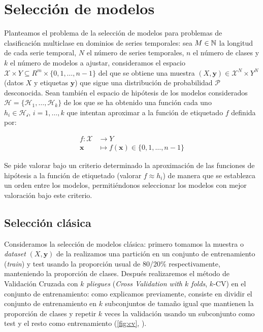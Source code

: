\chapter{Selección de modelos}\label{ch:pv}

Planteamos el problema de la selección de modelos para problemas de clasificación multiclase en dominios de series temporales: sea $M \in \mathbb{N}$ la longitud de cada serie temporal, $N$ el número de series temporales, $n$ el número de clases y $k$ el número de modelos a ajustar, consideramos el espacio $\mathcal{X} \times Y \subseteq R^m \times \{0, 1, \ldots, n - 1\} $ del que se obtiene una muestra $(X, \textbf{y}) \in \mathcal{X}^N \times Y^N$ (datos $X$ y etiquetas $\textbf{y}$) que sigue una distribución de probabilidad $\mathcal{P}$ desconocida. Sean también el espacio de hipótesis de los modelos considerados $\mathcal{H} = \{\mathcal{H}_1, \ldots, \mathcal{H}_k\}$ de los que se ha obtenido una función cada uno $h_i \in \mathcal{H_i}, \, i = 1, \ldots, k$ que intentan aproximar a la función de etiquetado $f$ definida por:

\begin{align*}
  f : \mathcal{X} & \to Y \\
  \textbf{x} & \mapsto f(\textbf{x}) \in \{0, 1, \ldots, n-1\}
\end{align*}

Se pide valorar bajo un criterio determinado la aproximación de las funciones de hipótesis a la función de etiquetado (valorar $f \approx h_i$) de manera que se establezca un orden entre los modelos, permitiéndonos seleccionar los modelos con mejor valoración bajo este criterio.

\section{Selección clásica}

Consideramos la selección de modelos clásica: primero tomamos la muestra o \emph{dataset} $(X, \textbf{y})$ de la realizamos una partición en un conjunto de entrenamiento (\emph{train}) y test usando la proporción usual de 80/20\% respectivamente, manteniendo la proporción de clases. Después realizaremos el método de Validación Cruzada con $k$ \emph{pliegues} (\emph{Cross Validation with $k$ folds}, $k$-CV) \cite{stone1974cross} en el conjunto de entrenamiento: como explicamos previamente, consiste en dividir el conjunto de entrenamiento en $k$ subconjuntos de tamaño igual que mantienen la proporción de clases y repetir $k$ veces la validación usando un subconjunto como test y el resto como entrenamiento (\autoref{fig:cv}, \cite{niu2018rfamyloid}).

